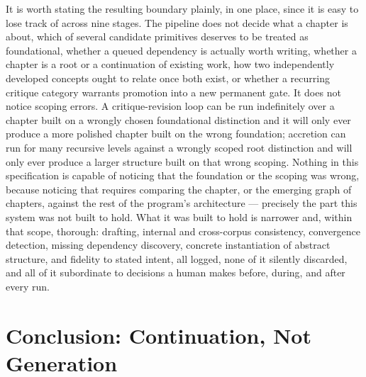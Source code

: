 \documentclass[11pt]{article}
\theoremstyle{definition}
\begin{document}
It is worth stating the resulting boundary plainly, in one place, since
it is easy to lose track of across nine stages. The pipeline does not
decide what a chapter is about, which of several candidate primitives
deserves to be treated as foundational, whether a queued dependency is
actually worth writing, whether a chapter is a root or a continuation
of existing work, how two independently developed concepts ought to
relate once both exist, or whether a recurring critique category
warrants promotion into a new permanent gate. It does not notice
scoping errors. A critique-revision loop can be run indefinitely over a
chapter built on a wrongly chosen foundational distinction and it will
only ever produce a more polished chapter built on the wrong
foundation; accretion can run for many recursive levels against a
wrongly scoped root distinction and will only ever produce a larger
structure built on that wrong scoping. Nothing in this specification is
capable of noticing that the foundation or the scoping was wrong,
because noticing that requires comparing the chapter, or the emerging
graph of chapters, against the rest of the program's architecture ---
precisely the part this system was not built to hold. What it was built
to hold is narrower and, within that scope, thorough: drafting,
internal and cross-corpus consistency, convergence detection, missing
dependency discovery, concrete instantiation of abstract structure, and
fidelity to stated intent, all logged, none of it silently discarded,
and all of it subordinate to decisions a human makes before, during,
and after every run.

\section{Conclusion: Continuation, Not Generation}
\label{sec:conclusion}
\end{document}

